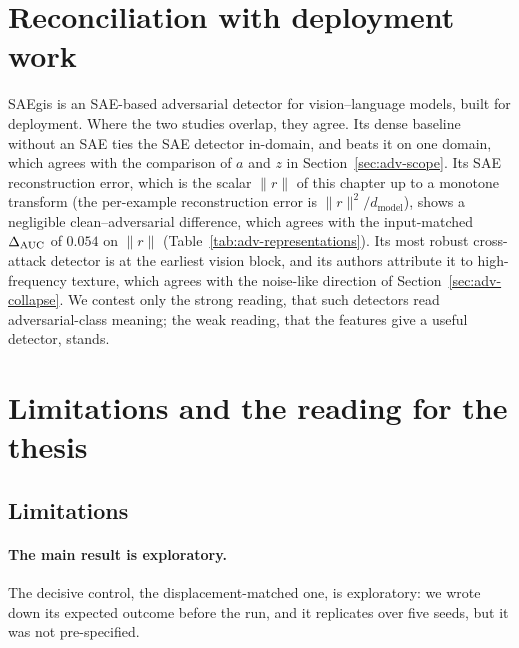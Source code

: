 \documentclass[../ppgc-tese.tex]{subfiles}
\begin{document}
\section{Reconciliation with deployment work}
\label{sec:adv-reconciliation}

SAEgis \cite{wang2026saegis} is an SAE-based adversarial detector for
vision--language models, built for deployment. Where the two studies overlap,
they agree. Its dense baseline without an SAE ties the SAE detector in-domain,
and beats it on one domain, which agrees with the comparison of $a$ and $z$ in
Section~\ref{sec:adv-scope}. Its SAE reconstruction error, which is the scalar
$\lVert r\rVert$ of this chapter up to a monotone transform (the per-example
reconstruction error is $\lVert r\rVert^2/d_{\mathrm{model}}$), shows a
negligible clean--adversarial difference, which agrees with the input-matched
$\Delta_{\mathrm{AUC}}$ of $0.054$ on $\lVert r\rVert$
(Table~\ref{tab:adv-representations}). Its most robust cross-attack detector
is at the earliest vision block, and its authors attribute it to
high-frequency texture, which agrees with the noise-like direction of
Section~\ref{sec:adv-collapse}.
We contest only the strong reading, that such detectors read adversarial-class
meaning; the weak reading, that the features give a useful detector, stands.

\section{Limitations and the reading for the thesis}
\label{sec:adv-closing}

\subsection{Limitations}

\paragraph*{The main result is exploratory.}
The decisive control, the displacement-matched one, is exploratory: we wrote
down its expected outcome before the run, and it replicates over five seeds,
but it was not pre-specified. 
\end{document}
